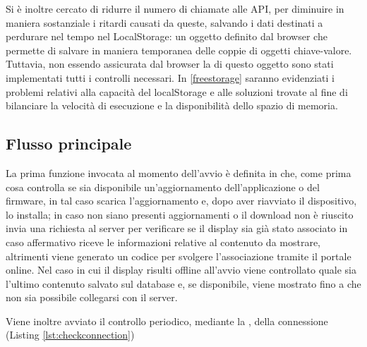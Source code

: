  Si è inoltre cercato di ridurre il numero di chiamate alle API, per diminuire in maniera sostanziale i ritardi causati da queste, salvando i dati destinati a perdurare nel tempo nel LocalStorage: un oggetto definito dal browser che permette di salvare in maniera temporanea delle coppie di oggetti chiave-valore. Tuttavia, non essendo assicurata dal browser la  di questo oggetto sono stati implementati tutti i controlli necessari. In \ref*{freestorage} saranno evidenziati i problemi relativi alla capacità del localStorage e alle soluzioni trovate al fine di bilanciare la velocità di esecuzione e la disponibilità dello spazio di memoria.

\subsection{Flusso principale}

La prima funzione invocata al momento dell'avvio è  definita in  che, come prima cosa controlla se sia disponibile un'aggiornamento dell'applicazione o del firmware, in tal caso scarica l'aggiornamento e, dopo aver riavviato il dispositivo, lo installa; in caso non siano presenti aggiornamenti o il download non è riuscito invia una richiesta al server per verificare se il display sia già stato associato in caso affermativo riceve le informazioni relative al contenuto da mostrare, altrimenti viene generato un codice per svolgere l'associazione tramite il portale online. Nel caso in cui il display risulti offline all'avvio viene controllato quale sia l'ultimo contenuto salvato sul database e, se disponibile, viene mostrato fino a che non sia possibile collegarsi con il server.

Viene inoltre avviato il controllo periodico, mediante la  , della connessione (Listing \ref*{lst:checkconnection}) 





